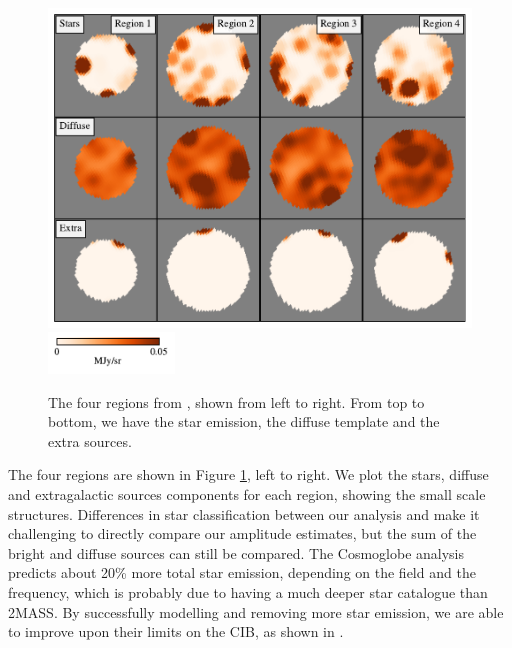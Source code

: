 \documentclass{aa}
\begin{document}
\begin{figure}
  \centering
      \includegraphics[width=\textwidth]{figs/regions/regions_01.pdf}\\
            \includegraphics[width=0.3\textwidth]{figs/regions/cbar.pdf}\\

  \caption{The four regions from \cite{DIRBE2mass}, shown from left to right. From top to bottom, we have the star emission, the diffuse template and the extra sources.}
  \label{fig:regions}
\end{figure}

The four regions are shown in Figure \ref{fig:regions}, left to right. We plot the stars, diffuse and extragalactic sources components for each region, showing the small scale structures. Differences in star classification between our analysis and \cite{DIRBE2mass} make it challenging to directly compare our amplitude estimates, but the sum of the bright and diffuse sources can still be compared. The Cosmoglobe analysis predicts about 20\% more total star emission, depending on the field and the frequency, which is probably due to having a much deeper star catalogue than 2MASS. By successfully modelling and removing more star emission, we are able to improve upon their limits on the CIB, as shown in \cite{CG02_02}. 

\end{document}
